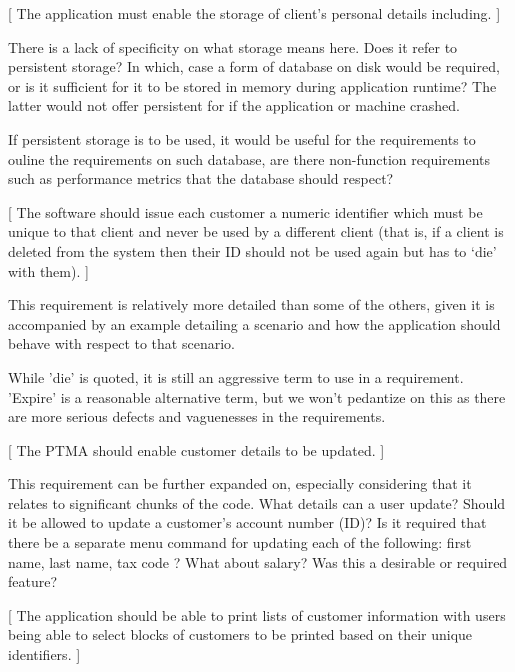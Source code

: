 [ The application must enable the storage of client’s personal details including.  ] 

There is a lack of specificity on what storage means here. Does it refer to persistent storage? In which, case a form of database on disk would be required, or is it sufficient for it to be stored in memory during application runtime? The latter would not offer persistent for if the application or machine crashed.  

If persistent storage is to be used, it would be useful for the requirements to ouline the requirements on such database, are there non-function requirements such as performance metrics that the database should respect? 

[ The software should issue each customer a numeric identifier which must be unique to that client and never be used by a different client (that is, if a client is deleted from the system then their ID should not be used again but has to ‘die’ with them). ] 

This requirement is relatively more detailed than some of the others, given it is accompanied by an example detailing a scenario and how the application should behave with respect to that scenario. 

While 'die' is quoted, it is still an aggressive term to use in a requirement. 'Expire' is a reasonable alternative term, but we won't pedantize on this as there are more serious defects and vaguenesses in the requirements.

[ The PTMA should enable customer details to be updated. ]

This requirement can be further expanded on, especially considering that it relates to significant chunks of the code. 
What details can a user update? Should it be allowed to update a customer's account number (ID)?
Is it required that there be a separate menu command for updating each of the following: first name, last name, tax code ? What about salary? Was this a desirable or required feature?    


[ The application should be able to print lists of customer information with users being able to select blocks of customers to be printed based on their unique identifiers. ]

